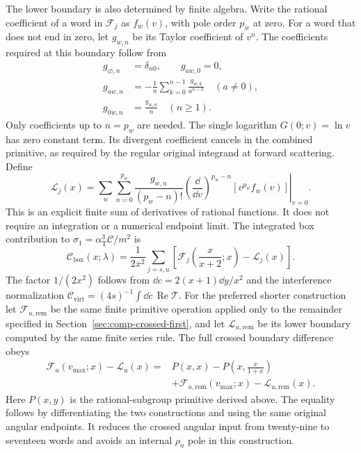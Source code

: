 The lower boundary is also determined by finite algebra.
Write the rational coefficient of a word in $\mathcal F_j$ as
$f_w(v)$, with pole order $p_w$ at zero. For a word that does not
end in zero, let $g_{w,n}$ be its Taylor coefficient of $v^n$.
The coefficients required at this boundary follow from
\begin{align}
 g_{\varnothing,n}&=\delta_{n0},\qquad g_{aw,0}=0,\\
 g_{aw,n}&=-\frac1n\sum_{k=0}^{n-1}
                   \frac{g_{w,k}}{a^{n-k}}\quad(a\ne0),\\
 g_{0w,n}&=\frac{g_{w,n}}n\quad(n\geq1).
\end{align}
Only coefficients up to $n=p_w$ are needed. The single logarithm
$G(0;v)=\ln v$ has zero constant term. Its divergent coefficient
cancels in the combined primitive, as required by the regular
original integrand at forward scattering. Define
\begin{equation}
 \mathcal L_j(x)=\sum_w\sum_{n=0}^{p_w}
 \frac{g_{w,n}}{(p_w-n)!}
 \left.\left(\frac{\dd}{\dd v}\right)^{p_w-n}
                    [v^{p_w}f_w(v)]\right|_{v=0}.
\end{equation}
This is an explicit finite sum of derivatives of rational functions.
It does not require an integration or a numerical endpoint limit.
The integrated box contribution to
$\sigma_1=\alpha_{\mathrm T}^3\mathcal C/m^2$ is
\begin{equation}
 \boxed{\mathcal C_{\mathrm{box}}(x;\lambda)
 =\frac1{2x^2}\sum_{j=s,u}
 \left[\mathcal F_j\!\left(\frac{x}{x+2};x\right)
                         -\mathcal L_j(x)\right].}
 \label{eq:comp-supp-box-angular-closed}
\end{equation}
The factor $1/(2x^2)$ follows from
$\dd c=2(x+1)\dd y/x^2$ and the interference normalization
$\mathcal C_{\mathrm{virt}}=(4s)^{-1}
\int\dd c\,\operatorname{Re}\mathcal T$.
For the preferred shorter construction let $\mathcal F_{u,\mathrm{rem}}$
be the same finite primitive operation applied only to the remainder
specified in Section~\ref{sec:comp-crossed-first}, and let
$\mathcal L_{u,\mathrm{rem}}$ be its lower boundary computed by the
same finite series rule. The full crossed boundary difference obeys
\begin{equation}
 \begin{aligned}
 \mathcal F_u(v_{\max};x)-\mathcal L_u(x)
 ={}&P(x,x)-P\!\left(x,\frac{x}{1+x}\right)\\
 &+\mathcal F_{u,\mathrm{rem}}(v_{\max};x)
       -\mathcal L_{u,\mathrm{rem}}(x).
 \end{aligned}
\end{equation}
Here $P(x,y)$ is the rational-subgroup primitive derived above.
The equality follows by differentiating the two constructions and using
the same original angular endpoints. It reduces the crossed angular
input from twenty-nine to seventeen words and avoids an internal
$\rho_u$ pole in this construction.

